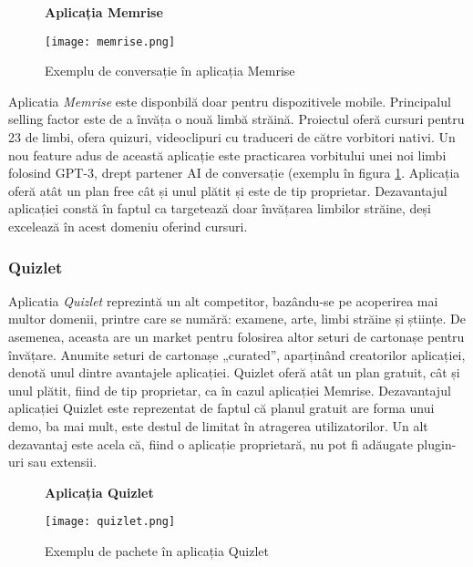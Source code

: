 \noindent\begin{minipage}{0.35\textwidth}
    \begin{figure}[H]
        \centering
        \textbf{Aplicația Memrise}\par\medskip
        \texttt{[image: memrise.png]}
        \caption{Exemplu de conversație în aplicația Memrise \cite{memriseImageExample}} 
        \label{fig:exemplu_memrise}
    \end{figure}
\end{minipage} 
\hfill
\begin{minipage}{0.55\textwidth}
   Aplicatia \textit{Memrise} \cite{memrise} este disponbilă doar pentru dispozitivele mobile. Principalul selling factor este de a învăța o nouă limbă străină. Proiectul oferă cursuri pentru 23 de limbi, ofera quizuri, videoclipuri cu traduceri de către vorbitori nativi. Un nou feature adus de această aplicație este practicarea vorbitului unei noi limbi folosind GPT-3, drept partener AI de conversație (exemplu în figura \ref{fig:exemplu_memrise}. Aplicația oferă atât un plan free cât și unul plătit și este de tip proprietar. Dezavantajul aplicației constă în faptul ca targetează doar învățarea limbilor străine, deși excelează în acest domeniu oferind cursuri.
\end{minipage}

\subsubsection{Quizlet}

\noindent\begin{minipage}{0.55\textwidth}
    Aplicatia \textit{Quizlet} \cite{quizlet} reprezintă un alt competitor, bazându-se pe acoperirea mai multor domenii, printre care se numără: examene, arte, limbi străine și științe. De asemenea, aceasta are un market pentru folosirea altor seturi de cartonașe pentru învățare. Anumite seturi de cartonașe „curated”, aparținând creatorilor aplicației, denotă unul dintre avantajele aplicației. Quizlet oferă atât un plan gratuit, cât și unul plătit, fiind de tip proprietar, ca în cazul aplicației Memrise. Dezavantajul aplicației Quizlet este reprezentat de faptul că planul gratuit are forma unui demo, ba mai mult, este destul de limitat în atragerea utilizatorilor. Un alt dezavantaj este acela că, fiind o aplicație proprietară, nu pot fi adăugate plugin-uri sau extensii.
\end{minipage} 
\hfill
\begin{minipage}{0.35\textwidth}
    \begin{figure}[H]
        \centering
        \textbf{Aplicația Quizlet}\par\medskip
        \texttt{[image: quizlet.png]}
        \caption{Exemplu de pachete în aplicația Quizlet \cite{quizletImageExample}} 
        \label{fig:exemplu_quizlet}
    \end{figure}
\end{minipage}

